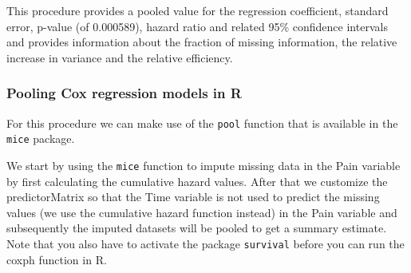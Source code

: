 \documentclass[
]{book}
\newenvironment{Shaded}{\begin{snugshade}}{\end{snugshade}}
\newcommand{\AttributeTok}[1]{\textcolor[rgb]{0.77,0.63,0.00}{#1}}
\newcommand{\CommentTok}[1]{\textcolor[rgb]{0.56,0.35,0.01}{\textit{#1}}}
\newcommand{\DecValTok}[1]{\textcolor[rgb]{0.00,0.00,0.81}{#1}}
\newcommand{\FunctionTok}[1]{\textcolor[rgb]{0.00,0.00,0.00}{#1}}
\newcommand{\NormalTok}[1]{#1}
\newcommand{\OtherTok}[1]{\textcolor[rgb]{0.56,0.35,0.01}{#1}}
\newcommand{\SpecialCharTok}[1]{\textcolor[rgb]{0.00,0.00,0.00}{#1}}
\newcommand{\StringTok}[1]{\textcolor[rgb]{0.31,0.60,0.02}{#1}}
\begin{document}
This procedure provides a pooled value for the regression coefficient, standard error, p-value (of 0.000589), hazard ratio and related 95\% confidence intervals and provides information about the fraction of missing information, the relative increase in variance and the relative efficiency.

\hypertarget{pooling-cox-regression-models-in-r}{%
\subsubsection{Pooling Cox regression models in R}\label{pooling-cox-regression-models-in-r}}

For this procedure we can make use of the \texttt{pool} function that is available in the \texttt{mice} package.

We start by using the \texttt{mice} function to impute missing data in the Pain variable by first calculating the cumulative hazard values. After that we customize the predictorMatrix so that the Time variable is not used to predict the missing values (we use the cumulative hazard function instead) in the Pain variable and subsequently the imputed datasets will be pooled to get a summary estimate. Note that you also have to activate the package \texttt{survival} before you can run the coxph function in R.

\begin{Shaded}
\end{Shaded}
\end{document}
